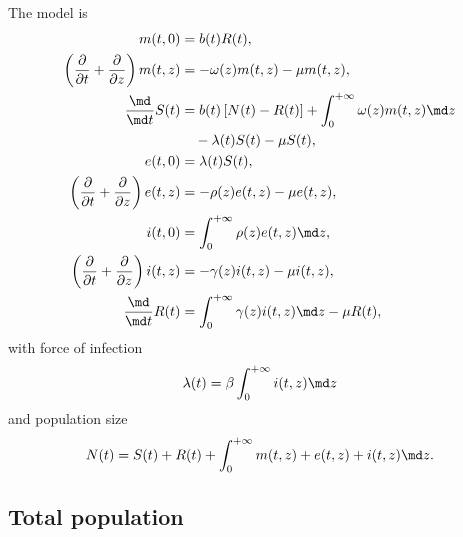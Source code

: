 \documentclass{jpmarticle}
\begin{document}
The model is
\begin{equation}
  \label{model_time_since_entry_structured}
  \begin{split}
    m(t, 0) &=
    b(t) R(t),
    \\
    \left(\frac{\partial}{\partial t}
      + \frac{\partial}{\partial z}\right)
    m(t, z) &=
    - \omega(z) m(t, z) - \mu m(t, z),
    \\
    \frac{\md}{\md t} S(t) &=
    b(t) \left[N(t) - R(t)\right]
    + \int_0^{+\infty} \omega(z) m(t, z) \md z
    \\ & \quad {}
    - \lambda(t) S(t) - \mu S(t),
    \\
    e(t, 0) &=
    \lambda(t) S(t),
    \\
    \left(\frac{\partial}{\partial t}
      + \frac{\partial}{\partial z}\right)
    e(t, z) &=
    - \rho(z) e(t, z) - \mu e(t, z),
    \\
    i(t, 0) &=
    \int_0^{+\infty} \rho(z) e(t, z) \md z,
    \\
    \left(\frac{\partial}{\partial t}
      + \frac{\partial}{\partial z}\right)
    i(t, z) &=
    - \gamma(z) i(t, z) - \mu i(t, z),
    \\
    \frac{\md}{\md t} R(t) &=
    \int_0^{+\infty} \gamma(z) i(t, z) \md z
    - \mu R(t),
  \end{split}
\end{equation}
with force of infection
\begin{equation}
  \lambda(t) = \beta \int_0^{+\infty} i(t, z) \md z
\end{equation}
and population size
\begin{equation}
  N(t) =
  S(t) + R(t)
  + \int_0^{+\infty} m(t, z) + e(t, z) + i(t, z) \md z.
\end{equation}


\subsection{Total population}
\end{document}
